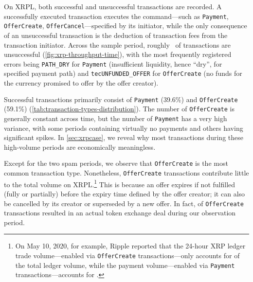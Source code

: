 On XRPL, both successful and unsuccessful transactions are recorded. A successfully executed transaction executes the command---such as \texttt{Payment}, \texttt{OfferCreate}, \texttt{OfferCancel}---specified by its initiator, while the only consequence of an unsuccessful transaction is the deduction of transaction fees from the transaction initiator.
Across the sample period, roughly~ of transactions are unsuccessful (\autoref{fig:xrp-throughput-time}), with the most frequently registered errors being \texttt{PATH\_DRY} for \texttt{Payment} (insufficient liquidity, hence ``dry'', for specified payment path) and \texttt{tecUNFUNDED\_OFFER} for \texttt{OfferCreate} (no funds for the currency promised to offer by the offer creator). 

Successful transactions primarily consist of \texttt{Payment} (39.6\%) and \texttt{OfferCreate} (59.1\%) (\autoref{tab:transaction-types-distribution}). The number of \texttt{OfferCreate} is generally constant across time, but the number of \texttt{Payment} has a very high variance, with some periods containing virtually no payments and others having significant spikes. 
In \autoref{sec:xrpcase}, we reveal why most transactions during these high-volume periods are economically meaningless. 

Except for the two spam periods, we observe that \texttt{OfferCreate} is the most common transaction type. 
Nonetheless, \texttt{OfferCreate} transactions contribute little to the total volume on XRPL.\footnote{
On May 10, 2020, for example, Ripple reported that the 24-hour XRP ledger trade volume---enabled via \texttt{OfferCreate} transactions---only accounts for  of the total ledger volume, while the payment volume---enabled via \texttt{Payment} transactions---accounts for .
} This is because an offer expires if not fulfilled (fully or partially) before the expiry time defined by the offer creator; it can also be cancelled by its creator or superseded by a new offer. In fact,  of \texttt{OfferCreate} transactions resulted in an actual token exchange deal during our observation period. 



